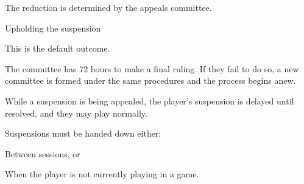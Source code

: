 \begin{deepEnumerate}
\begin{deepEnumerate}
\begin{deepEnumerate}
\begin{deepEnumerate}
				\item The reduction is determined by the appeals committee.
			\end{deepEnumerate}
			\item Upholding the suspension
			\begin{deepEnumerate}
				\item This is the default outcome.
			\end{deepEnumerate}
		\end{deepEnumerate}
		\item The committee has 72 hours to make a final ruling.
		If they fail to do so,
		a new committee is formed under the same procedures and the process begins anew.
		\item While a suspension is being appealed,
		the player's suspension is delayed until resolved,
		and they may play normally.
	\end{deepEnumerate}
	\item Suspensions must be handed down either:
	\begin{deepEnumerate}
		\item Between sessions, or
		\item When the player is not currently playing in a game.
	\end{deepEnumerate}
\end{deepEnumerate}

